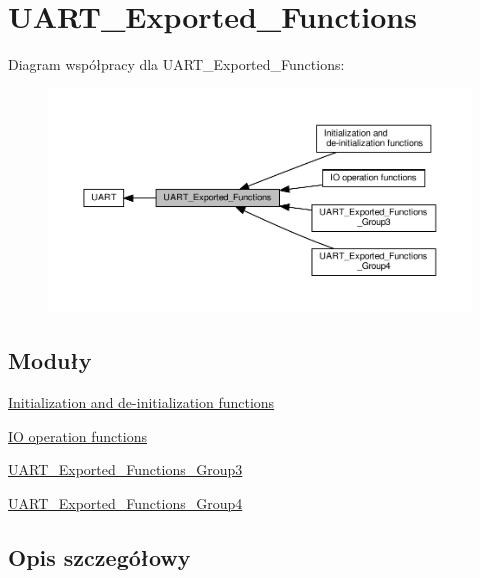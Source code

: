 \hypertarget{group___u_a_r_t___exported___functions}{}\section{U\+A\+R\+T\+\_\+\+Exported\+\_\+\+Functions}
\label{group___u_a_r_t___exported___functions}
Diagram współpracy dla U\+A\+R\+T\+\_\+\+Exported\+\_\+\+Functions\+:\nopagebreak
\begin{figure}[H]
\begin{center}
\leavevmode
\includegraphics[width=350pt]{group___u_a_r_t___exported___functions}
\end{center}
\end{figure}
\subsection*{Moduły}
\begin{DoxyCompactItemize}
\item 
\hyperlink{group___u_a_r_t___exported___functions___group1}{Initialization and de-\/initialization functions}
\item 
\hyperlink{group___u_a_r_t___exported___functions___group2}{I\+O operation functions}
\item 
\hyperlink{group___u_a_r_t___exported___functions___group3}{U\+A\+R\+T\+\_\+\+Exported\+\_\+\+Functions\+\_\+\+Group3}
\item 
\hyperlink{group___u_a_r_t___exported___functions___group4}{U\+A\+R\+T\+\_\+\+Exported\+\_\+\+Functions\+\_\+\+Group4}
\end{DoxyCompactItemize}


\subsection{Opis szczegółowy}

